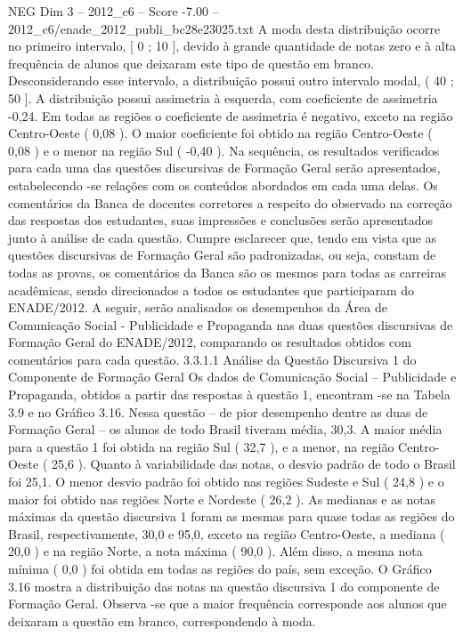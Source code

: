 \begin{textsample}{NEG Dim 3 – 2012\_c6 – Score -7.00 – 2012\_c6/enade\_2012\_publi\_bc28e23025.txt}
A moda desta distribuição ocorre no primeiro intervalo, [ 0 ; 10 ], devido à grande quantidade de notas zero e à alta frequência de alunos que deixaram este tipo de questão em branco.
Desconsiderando esse intervalo, a distribuição possui outro intervalo modal, ( 40 ; 50 ].
A distribuição possui assimetria à esquerda, com coeficiente de assimetria -0,24.
Em todas as regiões o coeficiente de assimetria é negativo, exceto na região Centro-Oeste ( 0,08 ).
O maior coeficiente foi obtido na região Centro-Oeste ( 0,08 ) e o menor na região Sul ( -0,40 ).
Na sequência, os resultados verificados para cada uma das questões discursivas de Formação Geral serão apresentados, estabelecendo -se relações com os conteúdos abordados em cada uma delas.
Os comentários da Banca de docentes corretores a respeito do observado na correção das respostas dos estudantes, suas impressões e conclusões serão apresentados junto à análise de cada questão.
Cumpre esclarecer que, tendo em vista que as questões discursivas de Formação Geral são padronizadas, ou seja, constam de todas as provas, os comentários da Banca são os mesmos para todas as carreiras acadêmicas, sendo direcionados a todos os estudantes que participaram do ENADE/2012.
A seguir, serão analisados os desempenhos da Área de Comunicação Social - Publicidade e Propaganda nas duas questões discursivas de Formação Geral do ENADE/2012, comparando os resultados obtidos com comentários para cada questão. 3.3.1.1 Análise da Questão Discursiva 1 do Componente de Formação Geral Os dados de Comunicação Social – Publicidade e Propaganda, obtidos a partir das respostas à questão 1, encontram -se na Tabela 3.9 e no Gráfico 3.16.
Nessa questão – de pior desempenho dentre as duas de Formação Geral – os alunos de todo Brasil tiveram média, 30,3.
A maior média para a questão 1 foi obtida na região Sul ( 32,7 ), e a menor, na região Centro-Oeste ( 25,6 ).
Quanto à variabilidade das notas, o desvio padrão de todo o Brasil foi 25,1.
O menor desvio padrão foi obtido nas regiões Sudeste e Sul ( 24,8 ) e o maior foi obtido nas regiões Norte e Nordeste ( 26,2 ).
As medianas e as notas máximas da questão discursiva 1 foram as mesmas para quase todas as regiões do Brasil, respectivamente, 30,0 e 95,0, exceto na região Centro-Oeste, a mediana ( 20,0 ) e na região Norte, a nota máxima ( 90,0 ).
Além disso, a mesma nota mínima ( 0,0 ) foi obtida em todas as regiões do país, sem exceção.
O Gráfico 3.16 mostra a distribuição das notas na questão discursiva 1 do componente de Formação Geral.
Observa -se que a maior frequência corresponde aos alunos que deixaram a questão em branco, correspondendo à moda.

\end{textsample}
